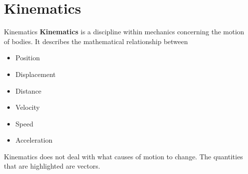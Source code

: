 \documentclass[12pt,compress,aspectratio=169,dvipsnames]{beamer}
\begin{document}




\section{Kinematics}

\begin{frame}{Kinematics}
  \textbf{Kinematics} is a discipline within mechanics concerning the motion of
  bodies. It describes the mathematical relationship between 
  \begin{itemize}
  \item<alert@1> Position
  \item<alert@1> Displacement
  \item Distance 
  \item<alert@1> Velocity
  \item Speed
  \item<alert@1> Acceleration
  \end{itemize}
  Kinematics does not deal with what causes of motion to change. The quantities
  that are highlighted are vectors.
\end{frame}
\end{document}
